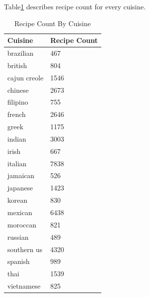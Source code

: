 \documentclass[sigconf]{acmart}
\begin{document}
Table\ref{t:recipecount} describes recipe count for every cuisine.
\begin{table}[htb]
\centering
\caption{Recipe Count By Cuisine}
\label{t:recipecount}
\begin{tabular}{ll}
Cuisine & Recipe Count \\
\hline
brazilian & 467 \\
british         &        804 \\
cajun creole    &       1546 \\
chinese         &       2673\\
filipino        &        755\\
french          &       2646\\
greek           &       1175\\
indian          &       3003\\
irish           &        667\\
italian         &       7838\\
jamaican        &        526\\
japanese        &       1423\\
korean          &        830\\
mexican         &       6438\\
moroccan        &        821\\
russian         &        489\\
southern us     &       4320\\
spanish         &        989\\
thai            &       1539\\
vietnamese      &        825\\

\end{tabular}
\end{table}
\end{document}
